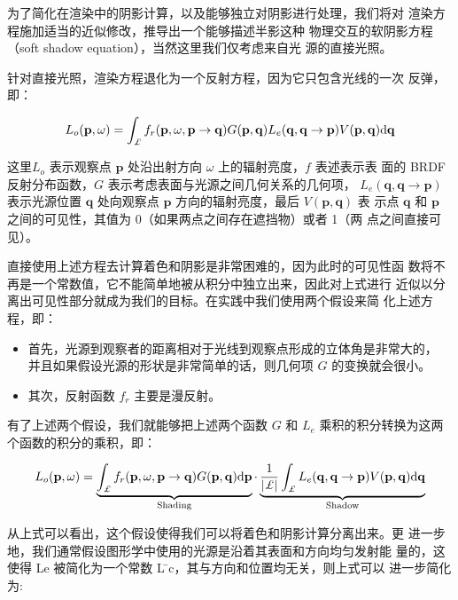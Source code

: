 为了简化在渲染中的阴影计算，以及能够独立对阴影进行处理，我们将对 渲染方程\cite{a:TheRenderingEquation}施加适当的近似修改，推导出一个能够描述半影这种 物理交互的软阴影方程（soft shadow equation），当然这里我们仅考虑来自光 源的直接光照。

针对直接光照，渲染方程退化为一个反射方程，因为它只包含光线的一次 反弹，即：

\begin{equation}
	L_{o}(\mathbf{p},\omega)=\int_{\pounds}f_{r}(\mathbf{p},\omega,\mathbf{p}\rightarrow\mathbf{q})G(\mathbf{p},\mathbf{q})L_{e}(\mathbf{q},\mathbf{q}\rightarrow\mathbf{p})V(\mathbf{p},\mathbf{q}){\rm d}\mathbf{q}
\end{equation}

这里$L_o$ 表示观察点 $\mathbf{p}$ 处沿出射方向 $\omega$ 上的辐射亮度，$f$ 表述表示表 面的 BRDF 反射分布函数，$G$ 表示考虑表面与光源之间几何关系的几何项， $L_e(\mathbf{q}, \mathbf{q} \to \mathbf{p})$ 表示光源位置 $\mathbf{q}$ 处向观察点 $\mathbf{p}$ 方向的辐射亮度，最后 $V (\mathbf{p}, \mathbf{q})$ 表 示点 $\mathbf{q}$ 和 $\mathbf{p}$ 之间的可见性，其值为 0（如果两点之间存在遮挡物）或者 1（两 点之间直接可见）。

直接使用上述方程去计算着色和阴影是非常困难的，因为此时的可见性函 数将不再是一个常数值，它不能简单地被从积分中独立出来，因此对上式进行 近似以分离出可见性部分就成为我们的目标。在实践中我们使用两个假设来简 化上述方程，即：

\begin{itemize}
	\item  首先，光源到观察者的距离相对于光线到观察点形成的立体角是非常大的， 并且如果假设光源的形状是非常简单的话，则几何项 $G$ 的变换就会很小。
	\item 其次，反射函数 $f_r$ 主要是漫反射。
\end{itemize}

有了上述两个假设，我们就能够把上述两个函数 $G$ 和 $L_e$ 乘积的积分转换为这两个函数的积分的乘积，即：

\begin{equation}
	L_{o}(\mathbf{p},\omega)=\underbrace{\int_{\pounds}f_{r}(\mathbf{p},\omega,\mathbf{p}\rightarrow\mathbf{q})G(\mathbf{p},\mathbf{q}){\rm d}\mathbf{p}}_{\rm Shading}\cdot\underbrace{\frac{1}{|\pounds|} \int_{\pounds} L_{e}(\mathbf{q},\mathbf{q}\rightarrow\mathbf{p})V(\mathbf{p},\mathbf{q}){\rm d}\mathbf{q}}_{\rm Shadow}
\end{equation} 

从上式可以看出，这个假设使得我们可以将着色和阴影计算分离出来。更 进一步地，我们通常假设图形学中使用的光源是沿着其表面和方向均匀发射能 量的，这使得 Le 被简化为一个常数 L ̄c，其与方向和位置均无关，则上式可以 进一步简化为:


